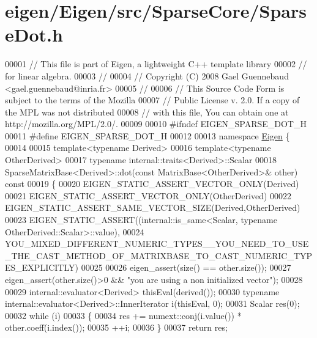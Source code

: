 \hypertarget{eigen_2_eigen_2src_2_sparse_core_2_sparse_dot_8h_source}{}\section{eigen/\+Eigen/src/\+Sparse\+Core/\+Sparse\+Dot.h}
\label{eigen_2_eigen_2src_2_sparse_core_2_sparse_dot_8h_source}

\begin{DoxyCode}
00001 \textcolor{comment}{// This file is part of Eigen, a lightweight C++ template library}
00002 \textcolor{comment}{// for linear algebra.}
00003 \textcolor{comment}{//}
00004 \textcolor{comment}{// Copyright (C) 2008 Gael Guennebaud <gael.guennebaud@inria.fr>}
00005 \textcolor{comment}{//}
00006 \textcolor{comment}{// This Source Code Form is subject to the terms of the Mozilla}
00007 \textcolor{comment}{// Public License v. 2.0. If a copy of the MPL was not distributed}
00008 \textcolor{comment}{// with this file, You can obtain one at http://mozilla.org/MPL/2.0/.}
00009 
00010 \textcolor{preprocessor}{#ifndef EIGEN\_SPARSE\_DOT\_H}
00011 \textcolor{preprocessor}{#define EIGEN\_SPARSE\_DOT\_H}
00012 
00013 \textcolor{keyword}{namespace }\hyperlink{namespace_eigen}{Eigen} \{ 
00014 
00015 \textcolor{keyword}{template}<\textcolor{keyword}{typename} Derived>
00016 \textcolor{keyword}{template}<\textcolor{keyword}{typename} OtherDerived>
00017 \textcolor{keyword}{typename} internal::traits<Derived>::Scalar
00018 SparseMatrixBase<Derived>::dot(\textcolor{keyword}{const} MatrixBase<OtherDerived>& other)\textcolor{keyword}{ const}
00019 \textcolor{keyword}{}\{
00020   EIGEN\_STATIC\_ASSERT\_VECTOR\_ONLY(Derived)
00021   EIGEN\_STATIC\_ASSERT\_VECTOR\_ONLY(OtherDerived)
00022   EIGEN\_STATIC\_ASSERT\_SAME\_VECTOR\_SIZE(Derived,OtherDerived)
00023   EIGEN\_STATIC\_ASSERT((internal::is\_same<Scalar, typename OtherDerived::Scalar>::value),
00024     
      YOU\_MIXED\_DIFFERENT\_NUMERIC\_TYPES\_\_YOU\_NEED\_TO\_USE\_THE\_CAST\_METHOD\_OF\_MATRIXBASE\_TO\_CAST\_NUMERIC\_TYPES\_EXPLICITLY)
00025 
00026   eigen\_assert(size() == other.size());
00027   eigen\_assert(other.size()>0 && \textcolor{stringliteral}{"you are using a non initialized vector"});
00028 
00029   internal::evaluator<Derived> thisEval(derived());
00030   \textcolor{keyword}{typename} internal::evaluator<Derived>::InnerIterator i(thisEval, 0);
00031   Scalar res(0);
00032   \textcolor{keywordflow}{while} (i)
00033   \{
00034     res += numext::conj(i.value()) * other.coeff(i.index());
00035     ++i;
00036   \}
00037   \textcolor{keywordflow}{return} res;

\end{DoxyCode}

